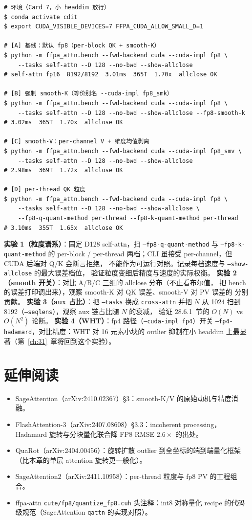 \begin{lstlisting}[style=console]
# 环境（Card 7，小 headdim 放行）
$ conda activate cdit
$ export CUDA_VISIBLE_DEVICES=7 FFPA_CUDA_ALLOW_SMALL_D=1

# [A] 基线：默认 fp8（per-block QK + smooth-K）
$ python -m ffpa_attn.bench --fwd-backend cuda --cuda-impl fp8 \
    --tasks self-attn --D 128 --no-bwd --show-allclose
# self-attn fp16  8192/8192  3.01ms  365T  1.70x  allclose OK

# [B] 强制 smooth-K（等价别名 --cuda-impl fp8_smk）
$ python -m ffpa_attn.bench --fwd-backend cuda --cuda-impl fp8 \
    --tasks self-attn --D 128 --no-bwd --show-allclose --fp8-smooth-k
# 3.02ms  365T  1.70x  allclose OK

# [C] smooth-V：per-channel V + 维度均值剥离
$ python -m ffpa_attn.bench --fwd-backend cuda --cuda-impl fp8_smv \
    --tasks self-attn --D 128 --no-bwd --show-allclose
# 2.98ms  369T  1.72x  allclose OK

# [D] per-thread QK 粒度
$ python -m ffpa_attn.bench --fwd-backend cuda --cuda-impl fp8 \
    --tasks self-attn --D 128 --no-bwd --show-allclose \
    --fp8-q-quant-method per-thread --fp8-k-quant-method per-thread
# 3.10ms  355T  1.65x  allclose OK
\end{lstlisting}

\textbf{实验 1（粒度谱系）}：固定 D128 self-attn，扫
\texttt{--fp8-q-quant-method} 与 \texttt{--fp8-k-quant-method} 的
per-block / per-thread 两档；CLI 虽接受 per-channel，但 CUDA 后端对 Q/K 会断言拒绝，
不能作为可运行对照。记录每档速度与 \texttt{--show-allclose} 的最大误差档位，
验证粒度变细后精度与速度的实际权衡。
\textbf{实验 2（smooth 开关）}：对比 A/B/C 三组的 allclose 分布（不止看布尔值，
把 bench 的误差打印调出来），观察 smooth-K 对 QK 误差、smooth-V 对 PV 误差的
分别贡献。
\textbf{实验 3（aux 占比）}：把 \texttt{--tasks} 换成 \texttt{cross-attn} 并把
$N$ 从 1024 扫到 8192（\texttt{--seqlens}），观察 aux 链占比随 $N$ 的衰减，
验证 28.6.1~节的 $O(N)$ vs $O(N^2)$ 论断。
\textbf{实验 4（WHT）}：fp4 路径（\texttt{--cuda-impl fp4}）开关
\texttt{--fp4-hadamard}，对比精度：WHT 对 16 元素小块的 outlier 抑制在小 headdim
上最显著（第~\ref{ch:31}~章将回到这个实验）。

\section*{延伸阅读}
\begin{itemize}[itemsep=0pt,topsep=2pt]
  \item SageAttention（arXiv:2410.02367）\S3：smooth-K/V 的原始动机与精度消融。
  \item FlashAttention-3（arXiv:2407.08608）\S3.3：incoherent processing，
        Hadamard 旋转与分块量化联合降 FP8 RMSE $2.6\times$ 的出处。
  \item QuaRot（arXiv:2404.00456）：旋转扩散 outlier 到全坐标的端到端量化框架
        （比本章的单层 attention 旋转更一般化）。
  \item SageAttention2（arXiv:2411.10958）：per-thread 粒度与 fp8 PV 的工程组合。
  \item ffpa-attn \texttt{cute/fp8/quantize\_fp8.cuh} 头注释：int8 对称量化
        recipe 的代码级规范（SageAttention \texttt{qattn} 的实现对照）。
\end{itemize}
